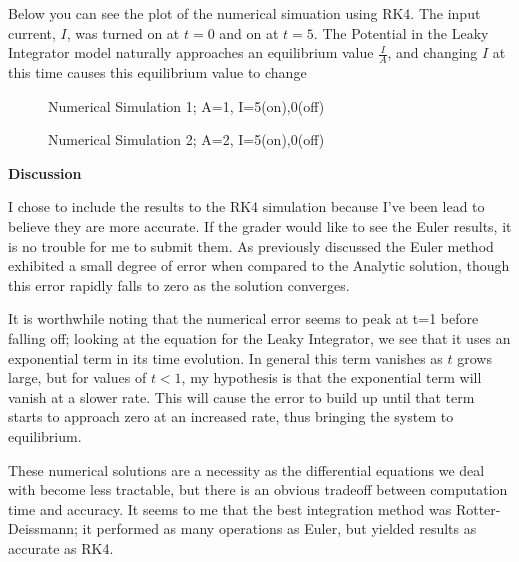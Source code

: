 \documentclass[a4paper,12pt]{article}
\begin{document}
\vfil\eject

Below you can see the plot of the numerical simuation using RK4. The input current, $I$, was turned on at $t=0$ and on at $t=5$. The Potential in the Leaky Integrator model naturally approaches an equilibrium value $\frac{I}{A}$, and changing $I$ at this time causes this equilibrium value to change

\begin{figure}[h!]
\begin{center}
\end{center}
\caption{\label{pict1}Numerical Simulation 1; A=1, I=5(on),0(off)}
\end{figure}

\begin{figure}[h!]
\begin{center}
\end{center}
\caption{\label{pict2}Numerical Simulation 2; A=2, I=5(on),0(off)}
\end{figure}

\vfil\eject

{\bf Discussion}
\bigskip

I chose to include the results to the RK4 simulation because I've been lead to believe they are more accurate. If the grader would like to see the Euler results, it is no trouble for me to submit them. As previously discussed the Euler method exhibited a small degree of error when compared to the Analytic solution, though this error rapidly falls to zero as the solution converges. 

\vspace{2mm}

It is worthwhile noting that the numerical error seems to peak at t=1 before falling off; looking at the equation for the Leaky Integrator, we see that it uses an exponential term in its time evolution. In general this term vanishes as $t$ grows large, but for values of $t<1$, my hypothesis is that the exponential term will vanish at a slower rate. This will cause the error to build up until that term starts to approach zero at an increased rate, thus bringing the system to equilibrium. 

\vspace{2mm}

These numerical solutions are a necessity as the differential equations we deal with become less tractable, but there is an obvious tradeoff between computation time and accuracy. It seems to me that the best integration method was Rotter-Deissmann; it performed as many operations as Euler, but yielded results as accurate as RK4. 
\end{document}
